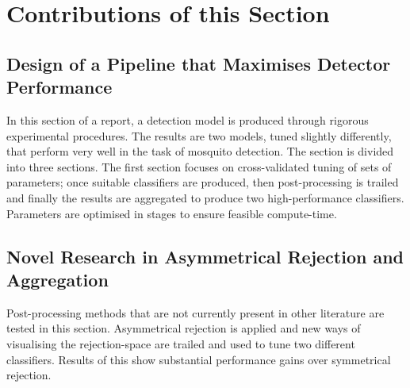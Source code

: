 \section{Contributions of this Section}
\label{sec:exp-overview}
    \subsection{Design of a Pipeline that Maximises Detector Performance}
    \label{subsec:exp-overview-detect}
        In this section of a report, a detection model is produced through rigorous experimental procedures. The results are two models, tuned slightly differently, that perform very well in the task of mosquito detection. The section is divided into three sections. The first section focuses on cross-validated tuning of sets of parameters; once suitable classifiers are produced, then post-processing is trailed and finally the results are aggregated to produce two high-performance classifiers. Parameters are optimised in stages to ensure feasible compute-time.
    
    \subsection{Novel Research in Asymmetrical Rejection and Aggregation}
    \label{subsec:exp-overview-novel}
        Post-processing methods that are not currently present in other literature are tested in this section. Asymmetrical rejection is applied and new ways of visualising the rejection-space are trailed and used to tune two different classifiers. Results of this show substantial performance gains over symmetrical rejection.
    
  
